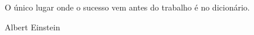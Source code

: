 \null %
\vfill
\epigraph{O único lugar onde o sucesso vem antes do trabalho é no dicionário.}{Albert Einstein}